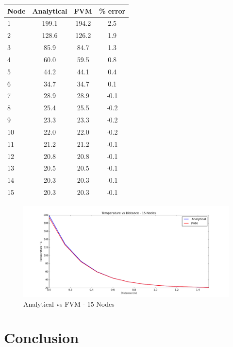 \documentclass[review]{elsarticle}
\begin{document}
\begin{center}
  \begin{tabular}{| l | c | c | c |}
    \hline
    Node & Analytical & FVM & \% error \\ \hline
    1 & 199.1 & 194.2 & 2.5 \\
    2 & 128.6 & 126.2 & 1.9 \\
    3 & 85.9  & 84.7  & 1.3 \\
    4 & 60.0  & 59.5  & 0.8 \\
    5 & 44.2  & 44.1  & 0.4 \\
    6 & 34.7  & 34.7  & 0.1 \\
    7 & 28.9  & 28.9  & -0.1  \\
    8 & 25.4  & 25.5  & -0.2  \\
    9 & 23.3  & 23.3  & -0.2  \\
    10  & 22.0  & 22.0  & -0.2  \\
    11  & 21.2  & 21.2  & -0.1  \\
    12  & 20.8  & 20.8  & -0.1  \\
    13  & 20.5  & 20.5  & -0.1  \\
    14  & 20.3  & 20.3  & -0.1  \\
    15  & 20.3  & 20.3  & -0.1  \\
    \hline
  \end{tabular}
\end{center}

\begin{figure}[H]
    \includegraphics[width=\textwidth]{img/15_nodes_avsf.png}
    \caption{Analytical vs FVM - 15 Nodes}
    \label{15nodes}
\end{figure}



\section{Conclusion}
\end{document}
